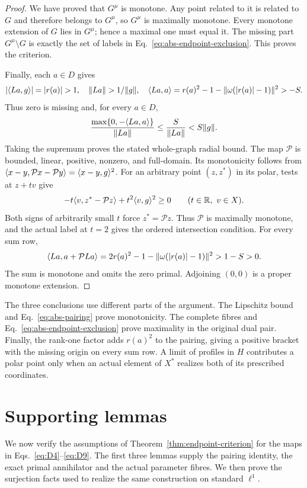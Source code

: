 \begin{proof}
We have proved that $G^\mu$ is monotone. Any point related to it
is related to $G$ and therefore belongs to $G^\mu$, so $G^\mu$
is maximally monotone. Every monotone extension of $G$ lies in
$G^\mu$; hence a maximal one must equal it. The missing part
$G^\mu\setminus G$ is exactly the set of labels in
Eq.~\eqref{eq:abs-endpoint-exclusion}. This proves the criterion.

Finally, each $a\in D$ gives
\[
|\pair{La}{g}|=|r(a)|>1,\quad
\|La\|>1/\|g\|,\quad
\pair{La}{a}=r(a)^2-1-\|\omega(|r(a)|-1)\|^2>-S.
\]
Thus zero is missing and, for every $a\in D$,
\[
\frac{\max\{0,-\langle La,a\rangle\}}{\|La\|}
\le\frac{S}{\|La\|}<S\|g\|.
\]
Taking the supremum proves the stated whole-graph radial bound.
The map $\mathcal P$ is bounded, linear, positive, nonzero, and full-domain.
Its monotonicity follows from
$\langle x-y,\mathcal Px-\mathcal Py\rangle=\langle x-y,g\rangle^2$.
For an arbitrary point $(z,z^*)$ in its polar, tests at $z+tv$ give
\[
-t\langle v,z^*-\mathcal Pz\rangle+t^2\langle v,g\rangle^2\ge0
\qquad(t\in\mathbb R,\ v\in X).
\]
Both signs of arbitrarily small $t$ force $z^*=\mathcal Pz$.
Thus $\mathcal P$ is maximally monotone, and the actual label at
$t=2$ gives the ordered intersection condition. For every sum row,
\[
\langle La,a+\mathcal PLa\rangle
=2r(a)^2-1-\|\omega(|r(a)|-1)\|^2>1-S>0.
\]
The sum is monotone and omits the zero primal. Adjoining $(0,0)$
is a proper monotone extension.
\end{proof}

The three conclusions use different parts of the argument. The Lipschitz
bound and Eq.~\eqref{eq:abs-pairing} prove monotonicity. The complete
fibres and Eq.~\eqref{eq:abs-endpoint-exclusion} prove maximality in the
original dual pair. Finally, the rank-one factor adds $r(a)^2$ to the
pairing, giving a positive bracket with the missing origin on every sum
row. A limit of profiles in $H$ contributes a polar point only when an
actual element of $X^*$ realizes both of its prescribed coordinates.

\section{Supporting lemmas}
\label{sec:supporting}
We now verify the assumptions of Theorem~\ref{thm:endpoint-criterion}
for the maps in Eqs.~\eqref{eq:D4}--\eqref{eq:D9}. The first three
lemmas supply the pairing identity, the exact primal annihilator and
the actual parameter fibres. We then prove the surjection facts used
to realize the same construction on standard $\ell^1$.

